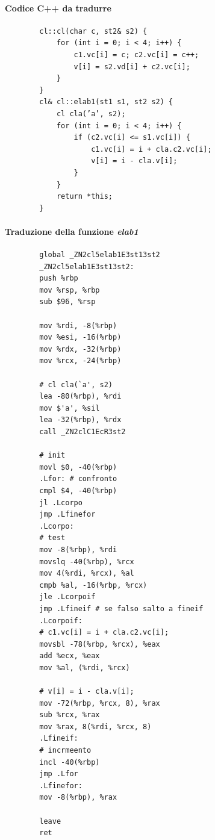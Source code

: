 	\paragraph{Codice C++ da tradurre}
	\begin{verbatim}
		cl::cl(char c, st2& s2) {
			for (int i = 0; i < 4; i++) {
				c1.vc[i] = c; c2.vc[i] = c++;
				v[i] = s2.vd[i] + c2.vc[i];
			}
		}
		cl& cl::elab1(st1 s1, st2 s2) {
			cl cla(’a’, s2);
			for (int i = 0; i < 4; i++) {
				if (c2.vc[i] <= s1.vc[i]) {
					c1.vc[i] = i + cla.c2.vc[i];
					v[i] = i - cla.v[i];    
				}
			}
			return *this;
		}
	\end{verbatim}
	\paragraph{Traduzione della funzione \emph{elab1}}
	\begin{verbatim}
		global _ZN2cl5elab1E3st13st2
		_ZN2cl5elab1E3st13st2:
		push %rbp
		mov %rsp, %rbp
		sub $96, %rsp
		
		mov %rdi, -8(%rbp)
		mov %esi, -16(%rbp)
		mov %rdx, -32(%rbp)
		mov %rcx, -24(%rbp)
		
		# cl cla(`a', s2)     
		lea -80(%rbp), %rdi
		mov $'a', %sil
		lea -32(%rbp), %rdx
		call _ZN2clC1EcR3st2
		
		# init
		movl $0, -40(%rbp)
		.Lfor: # confronto
		cmpl $4, -40(%rbp)
		jl .Lcorpo
		jmp .Lfinefor
		.Lcorpo:
		# test
		mov -8(%rbp), %rdi
		movslq -40(%rbp), %rcx
		mov 4(%rdi, %rcx), %al
		cmpb %al, -16(%rbp, %rcx)
		jle .Lcorpoif
		jmp .Lfineif # se falso salto a fineif
		.Lcorpoif:
		# c1.vc[i] = i + cla.c2.vc[i];
		movsbl -78(%rbp, %rcx), %eax
		add %ecx, %eax
		mov %al, (%rdi, %rcx)
		
		# v[i] = i - cla.v[i];    
		mov -72(%rbp, %rcx, 8), %rax
		sub %rcx, %rax
		mov %rax, 8(%rdi, %rcx, 8)
		.Lfineif:
		# incrmeento
		incl -40(%rbp)
		jmp .Lfor
		.Lfinefor:
		mov -8(%rbp), %rax
		
		leave
		ret
	\end{verbatim}
	
